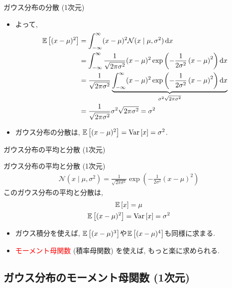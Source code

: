 \documentclass[dvipdfmx,notheorems,t]{beamer}
\begin{document}
\begin{frame}{ガウス分布の分散 (1次元)}
\begin{itemize}
  \item よって,
  \begin{align*}
    \operatorname{\mathbb{E}} \left[ (x - \mu)^2 \right] &= \int_{-\infty}^\infty (x - \mu)^2 \mathcal{N}(x \mid \mu, \sigma^2) \dd{x} \\
      &= \int_{-\infty}^\infty \frac{1}{\sqrt{2 \pi \sigma^2}} (x - \mu)^2
        \exp \left( -\frac{1}{2 \sigma^2} \left( x - \mu \right)^2 \right) \dd{x} \\
      &= \frac{1}{\sqrt{2 \pi \sigma^2}} \underbrace{\int_{-\infty}^\infty (x - \mu)^2
        \exp \left( -\frac{1}{2 \sigma^2} \left( x - \mu \right)^2 \right) \dd{x}}_{\sigma^2 \sqrt{2 \pi \sigma^2}} \\
      &= \frac{1}{\sqrt{2 \pi \sigma^2}} \sigma^2 \sqrt{2 \pi \sigma^2} = \sigma^2
  \end{align*}
  \item ガウス分布の分散は, $\operatorname{\mathbb{E}} \left[ (x - \mu)^2 \right] = \operatorname{Var} \left[ x \right] = \sigma^2$.
\end{itemize}
\end{frame}

\begin{frame}{ガウス分布の平均と分散 (1次元)}
\begin{block}{ガウス分布の平均と分散 (1次元)}
  \begin{align*}
    \mathcal{N}(x \mid \mu, \sigma^2) = \frac{1}{\sqrt{2 \pi \sigma^2}}
      \exp \left( -\frac{1}{2 \sigma^2} \left( x - \mu \right)^2 \right)
  \end{align*}
  このガウス分布の平均と分散は,
  \begin{gather*}
    \operatorname{\mathbb{E}} \left[ x \right] = \mu \\
    \operatorname{\mathbb{E}} \left[ (x - \mu)^2 \right] = \operatorname{Var} \left[ x \right] = \sigma^2
  \end{gather*}
\end{block}

\begin{itemize}
  \item ガウス積分を使えば, $\operatorname{\mathbb{E}} \left[ (x - \mu)^3 \right]$や$\operatorname{\mathbb{E}} \left[ (x - \mu)^4 \right]$も同様に求まる.
  \item \textcolor{red}{モーメント母関数} (積率母関数) を使えば, もっと楽に求められる.
\end{itemize}
\end{frame}

\subsection{ガウス分布のモーメント母関数 (1次元)}
\end{document}
